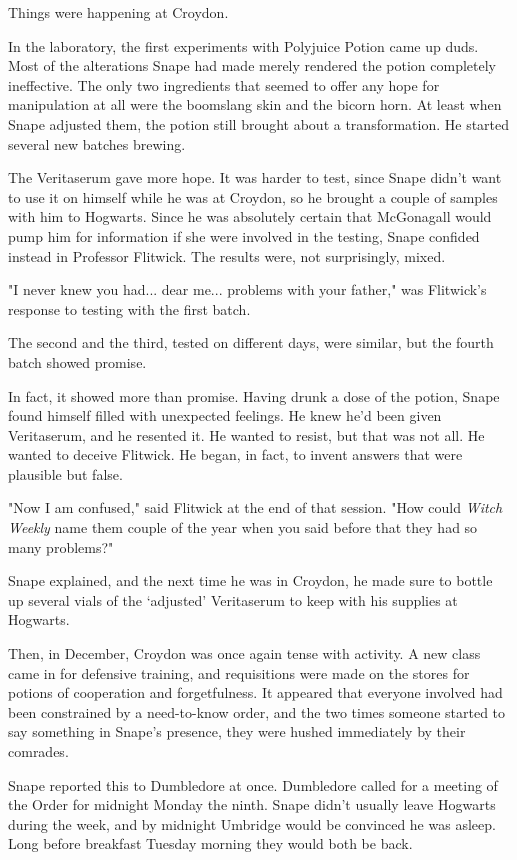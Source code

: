 Things were happening at Croydon.

In the laboratory, the first experiments with Polyjuice Potion came up duds. Most of the alterations Snape had made merely rendered the potion completely ineffective. The only two ingredients that seemed to offer any hope for manipulation at all were the boomslang skin and the bicorn horn. At least when Snape adjusted them, the potion still brought about a transformation. He started several new batches brewing.

The Veritaserum gave more hope. It was harder to test, since Snape didn't want to use it on himself while he was at Croydon, so he brought a couple of samples with him to Hogwarts. Since he was absolutely certain that McGonagall would pump him for information if she were involved in the testing, Snape confided instead in Professor Flitwick. The results were, not surprisingly, mixed.

"I never knew you had... dear me... problems with your father," was Flitwick's response to testing with the first batch.

The second and the third, tested on different days, were similar, but the fourth batch showed promise.

In fact, it showed more than promise. Having drunk a dose of the potion, Snape found himself filled with unexpected feelings. He knew he'd been given Veritaserum, and he resented it. He wanted to resist, but that was not all. He wanted to deceive Flitwick. He began, in fact, to invent answers that were plausible but false.

"Now I am confused," said Flitwick at the end of that session. "How could \emph{Witch Weekly} name them couple of the year when you said before that they had so many problems?"

Snape explained, and the next time he was in Croydon, he made sure to bottle up several vials of the `adjusted' Veritaserum to keep with his supplies at Hogwarts.

Then, in December, Croydon was once again tense with activity. A new class came in for defensive training, and requisitions were made on the stores for potions of cooperation and forgetfulness. It appeared that everyone involved had been constrained by a need-to-know order, and the two times someone started to say something in Snape's presence, they were hushed immediately by their comrades.

Snape reported this to Dumbledore at once. Dumbledore called for a meeting of the Order for midnight Monday the ninth. Snape didn't usually leave Hogwarts during the week, and by midnight Umbridge would be convinced he was asleep. Long before breakfast Tuesday morning they would both be back.

